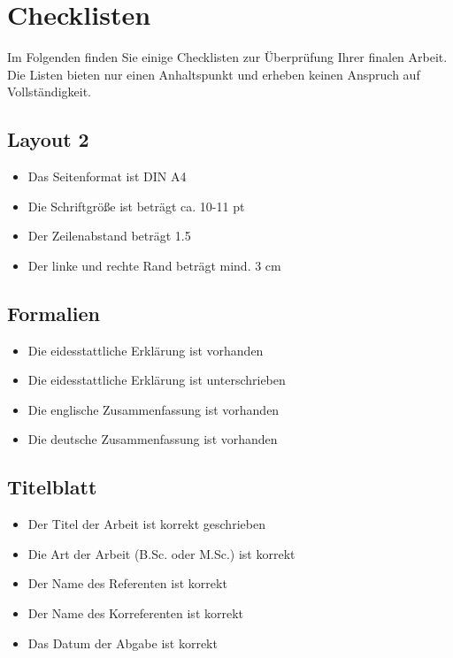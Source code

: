 \section{Checklisten}\label{sec:checklisten}
%
Im Folgenden finden Sie einige Checklisten zur Überprüfung Ihrer finalen Arbeit. Die Listen bieten nur einen Anhaltspunkt und erheben keinen Anspruch auf Vollständigkeit.

\subsection*{Layout 2}\label{ssec:layout-2}
%
\begin{itemize}
  \vspace{-3mm}
  \item[\Square] Das Seitenformat ist DIN A4
  \item[\Square] Die Schriftgröße ist beträgt ca. 10-11 pt
  \item[\Square] Der Zeilenabstand beträgt 1.5
  \item[\Square] Der linke und rechte Rand beträgt mind. 3 cm
\end{itemize}

\subsection*{Formalien}\label{ssec:formalien}
%
\begin{itemize}
  \vspace{-3mm}
  \item[\Square] Die eidesstattliche Erklärung ist vorhanden
  \item[\Square] Die eidesstattliche Erklärung ist unterschrieben
  \item[\Square] Die englische Zusammenfassung ist vorhanden
  \item[\Square] Die deutsche Zusammenfassung ist vorhanden
\end{itemize}

\subsection*{Titelblatt}\label{ssec:titelblatt}
%
\begin{itemize}
  \vspace{-3mm}
  \item[\Square] Der Titel der Arbeit ist korrekt geschrieben
  \item[\Square] Die Art der Arbeit (B.Sc. oder M.Sc.) ist korrekt
  \item[\Square] Der Name des Referenten ist korrekt
  \item[\Square] Der Name des Korreferenten ist korrekt
  \item[\Square] Das Datum der Abgabe ist korrekt
\end{itemize}

